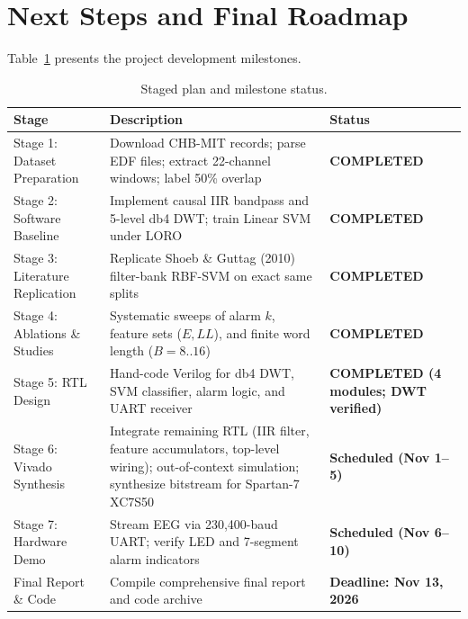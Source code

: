 \documentclass[10pt,twocolumn,letterpaper]{article}
\begin{document}
\section{Next Steps and Final Roadmap}
\label{sec:next}

Table~\ref{tab:plan} presents the project development milestones.

\begin{table}[t]
\centering
\caption{Staged plan and milestone status.}
\label{tab:plan}
\small
\begin{tabularx}{\textwidth}{@{}p{3.2cm}Xl@{}}
\toprule
Stage & Description & Status \\
\midrule
Stage 1: Dataset Preparation & Download CHB-MIT records; parse EDF files; extract 22-channel windows; label 50\% overlap & \textbf{COMPLETED} \\
Stage 2: Software Baseline & Implement causal IIR bandpass and 5-level db4 DWT; train Linear SVM under LORO & \textbf{COMPLETED} \\
Stage 3: Literature Replication & Replicate Shoeb \& Guttag (2010) filter-bank RBF-SVM on exact same splits & \textbf{COMPLETED} \\
Stage 4: Ablations \& Studies & Systematic sweeps of alarm $k$, feature sets ($E, LL$), and finite word length ($B=8..16$) & \textbf{COMPLETED} \\
Stage 5: RTL Design & Hand-code Verilog for db4 DWT, SVM classifier, alarm logic, and UART receiver & \textbf{COMPLETED (4 modules; DWT verified)} \\
Stage 6: Vivado Synthesis & Integrate remaining RTL (IIR filter, feature accumulators, top-level wiring); out-of-context simulation; synthesize bitstream for Spartan-7 XC7S50 & \textbf{Scheduled (Nov 1--5)} \\
Stage 7: Hardware Demo & Stream EEG via 230,400-baud UART; verify LED and 7-segment alarm indicators & \textbf{Scheduled (Nov 6--10)} \\
Final Report \& Code & Compile comprehensive final report and code archive & \textbf{Deadline: Nov 13, 2026} \\
\bottomrule
\end{tabularx}
\end{table}
\end{document}

